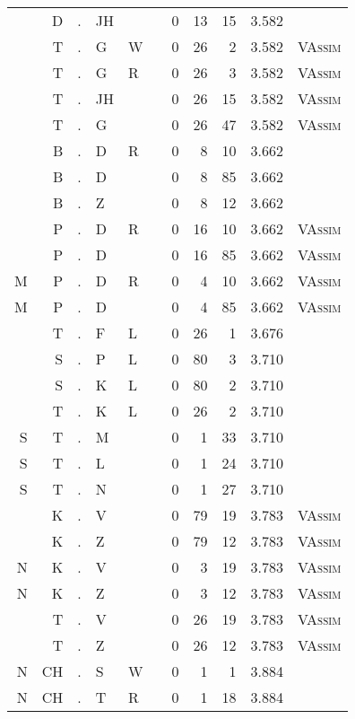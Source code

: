 \begin{longtable}{r@{ } r@{ } c@{ } l@{ } l@{ } l@{ } r r r r l }
  & D & . & JH &   &   & 0 & 13 & 15 & 3.582 &  \\
  & T & . & G & W &   & 0 & 26 & 2 & 3.582 & \textsc{VAssim} \\
  & T & . & G & R &   & 0 & 26 & 3 & 3.582 & \textsc{VAssim} \\
  & T & . & JH &   &   & 0 & 26 & 15 & 3.582 & \textsc{VAssim} \\
  & T & . & G &   &   & 0 & 26 & 47 & 3.582 & \textsc{VAssim} \\
  & B & . & D & R &   & 0 & 8 & 10 & 3.662 &  \\
  & B & . & D &   &   & 0 & 8 & 85 & 3.662 &  \\
  & B & . & Z &   &   & 0 & 8 & 12 & 3.662 &  \\
  & P & . & D & R &   & 0 & 16 & 10 & 3.662 & \textsc{VAssim} \\
  & P & . & D &   &   & 0 & 16 & 85 & 3.662 & \textsc{VAssim} \\
M & P & . & D & R &   & 0 & 4 & 10 & 3.662 & \textsc{VAssim} \\
M & P & . & D &   &   & 0 & 4 & 85 & 3.662 & \textsc{VAssim} \\
  & T & . & F & L &   & 0 & 26 & 1 & 3.676 &  \\
  & S & . & P & L &   & 0 & 80 & 3 & 3.710 &  \\
  & S & . & K & L &   & 0 & 80 & 2 & 3.710 &  \\
  & T & . & K & L &   & 0 & 26 & 2 & 3.710 &  \\
S & T & . & M &   &   & 0 & 1 & 33 & 3.710 &  \\
S & T & . & L &   &   & 0 & 1 & 24 & 3.710 &  \\
S & T & . & N &   &   & 0 & 1 & 27 & 3.710 &  \\
  & K & . & V &   &   & 0 & 79 & 19 & 3.783 & \textsc{VAssim} \\
  & K & . & Z &   &   & 0 & 79 & 12 & 3.783 & \textsc{VAssim} \\
N & K & . & V &   &   & 0 & 3 & 19 & 3.783 & \textsc{VAssim} \\
N & K & . & Z &   &   & 0 & 3 & 12 & 3.783 & \textsc{VAssim} \\
  & T & . & V &   &   & 0 & 26 & 19 & 3.783 & \textsc{VAssim} \\
  & T & . & Z &   &   & 0 & 26 & 12 & 3.783 & \textsc{VAssim} \\
N & CH & . & S & W &   & 0 & 1 & 1 & 3.884 &  \\
N & CH & . & T & R &   & 0 & 1 & 18 & 3.884 &  \\

\end{longtable}
